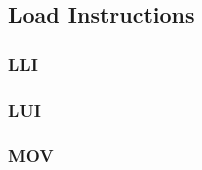\subsection{Load Instructions}

\subsubsection{LLI }\label{sec:LLI}

\subsubsection{LUI }\label{sec:LUI}

\subsubsection{MOV }\label{sec:MOV}